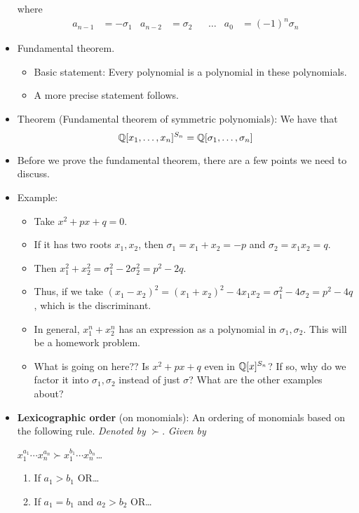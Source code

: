 \documentclass[../notes.tex]{subfiles}
\begin{document}
\begin{itemize}
    where
    \begin{align*}
        a_{n-1} &= -\sigma_1&
        a_{n-2} &= \sigma_2&
        &\dots&
        a_0 &= (-1)^n\sigma_n
    \end{align*}
    \item Fundamental theorem.
    \begin{itemize}
        \item Basic statement: Every polynomial is a polynomial in these polynomials.
        \item A more precise statement follows.
    \end{itemize}
    \item Theorem (Fundamental theorem of symmetric polynomials): We have that
    \begin{equation*}
        \mathbb{Q}[x_1,\dots,x_n]^{S_n} = \mathbb{Q}[\sigma_1,\dots,\sigma_n]
    \end{equation*}
    \item Before we prove the fundamental theorem, there are a few points we need to discuss.
    \item Example:
    \begin{itemize}
        \item Take $x^2+px+q=0$.
        \item If it has two roots $x_1,x_2$, then $\sigma_1=x_1+x_2=-p$ and $\sigma_2=x_1x_2=q$.
        \item Then $x_1^2+x_2^2=\sigma_1^2-2\sigma_2^2=p^2-2q$.
        \item Thus, if we take $(x_1-x_2)^2=(x_1+x_2)^2-4x_1x_2=\sigma_1^2-4\sigma_2=p^2-4q$, which is the discriminant.
        \item In general, $x_1^n+x_2^n$ has an expression as a polynomial in $\sigma_1,\sigma_2$. This will be a homework problem.
        \item What is going on here?? Is $x^2+px+q$ even in $\mathbb{Q}[x]^{S_n}$? If so, why do we factor it into $\sigma_1,\sigma_2$ instead of just $\sigma$? What are the other examples about?
    \end{itemize}
    \item \textbf{Lexicographic order} (on monomials): An ordering of monomials based on the following rule. \emph{Denoted by} $\bm{\succ}$. \emph{Given by}\par
    $x_1^{a_1}\cdots x_n^{a_n}\succ x_1^{b_1}\cdots x_n^{b_n}$\dots
    \begin{enumerate}
        \item If $a_1>b_1$ OR\dots
        \item If $a_1=b_1$ and $a_2>b_2$ OR\dots

\end{enumerate}
\end{itemize}
\end{document}
